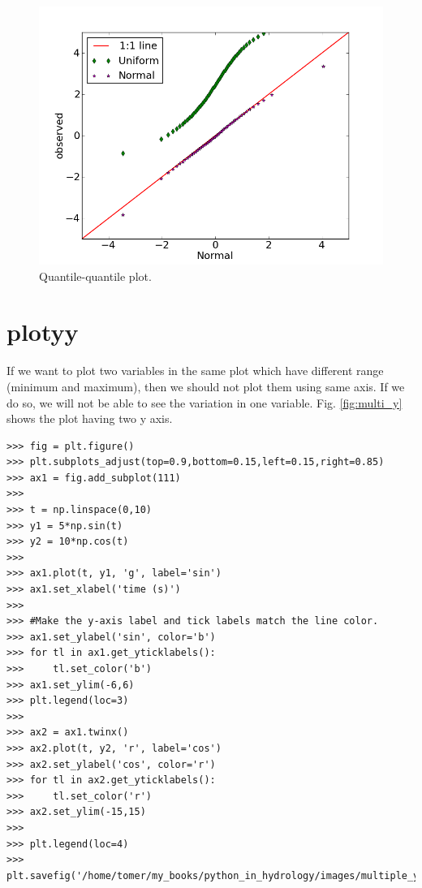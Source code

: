 \documentclass[10pt]{book}
\begin{document}
{\beforefig
\begin{figure}[h!]
  \centering
    \includegraphics[scale=0.5]{images/q_q.png}
  \caption{Quantile-quantile plot.}
   \label{fig:q_q}
\end{figure}
\afterfig

\section{plotyy}
If we want to plot two variables in the same plot which have different range (minimum and maximum), then we should not plot them using same axis. If we do so, we will not be able to see the variation in one variable. Fig. \ref{fig:multi_y} shows the plot having two y axis. 
\beforeverb
\begin{verbatim}
>>> fig = plt.figure()
>>> plt.subplots_adjust(top=0.9,bottom=0.15,left=0.15,right=0.85)
>>> ax1 = fig.add_subplot(111)
>>> 
>>> t = np.linspace(0,10)
>>> y1 = 5*np.sin(t)
>>> y2 = 10*np.cos(t)
>>> 
>>> ax1.plot(t, y1, 'g', label='sin')
>>> ax1.set_xlabel('time (s)')
>>> 
>>> #Make the y-axis label and tick labels match the line color.
>>> ax1.set_ylabel('sin', color='b')
>>> for tl in ax1.get_yticklabels():
>>>     tl.set_color('b')
>>> ax1.set_ylim(-6,6)
>>> plt.legend(loc=3)
>>> 
>>> ax2 = ax1.twinx()
>>> ax2.plot(t, y2, 'r', label='cos')
>>> ax2.set_ylabel('cos', color='r')
>>> for tl in ax2.get_yticklabels():
>>>     tl.set_color('r')
>>> ax2.set_ylim(-15,15)    
>>> 
>>> plt.legend(loc=4)
>>> plt.savefig('/home/tomer/my_books/python_in_hydrology/images/multiple_y.png')
\end{verbatim}
\afterverb

}
\end{document}
